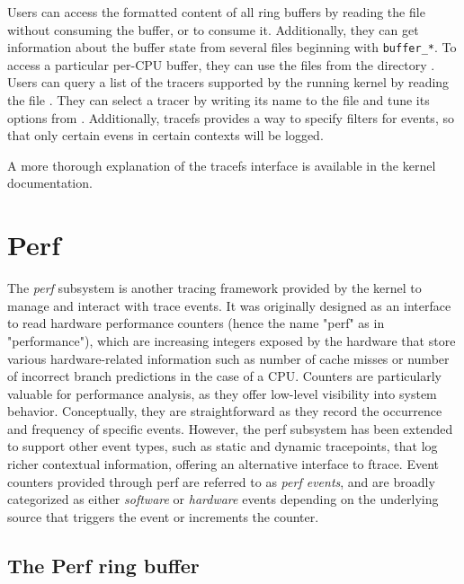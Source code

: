 Users can access the formatted content of all ring buffers by reading the
 file without consuming the buffer, or
 to consume it. Additionally, they can get
information about the buffer state from several files beginning with
\verb|buffer_*|. To access a particular per-CPU buffer, they can use the files
from the directory . Users can query a
list of the tracers supported by the running kernel by reading the file
. They can select a tracer by writing its
name to the file  and tune its options from
. Additionally, tracefs provides a way
to specify filters for events, so that only certain evens in certain contexts
will be logged.

A more thorough explanation of the tracefs interface is available in the kernel
documentation.

\section{Perf}

The \textit{perf} subsystem is another tracing framework provided by the kernel
to manage and interact with trace events. It was originally designed as an
interface to read hardware performance counters (hence the name "perf" as in
"performance"), which are increasing integers exposed by the hardware that store
various hardware-related information such as number of cache misses or number of
incorrect branch predictions in the case of a CPU. Counters are particularly
valuable for performance analysis, as they offer low-level visibility into
system behavior. Conceptually, they are straightforward as they record the
occurrence and frequency of specific events. However, the perf subsystem has
been extended to support other event types, such as static and dynamic
tracepoints, that log richer contextual information, offering an alternative
interface to ftrace. Event counters provided through perf are referred to as
\textit{perf events}, and are broadly categorized as either \textit{software} or
\textit{hardware} events depending on the underlying source that triggers the
event or increments the counter.

\subsection{The Perf ring buffer}

